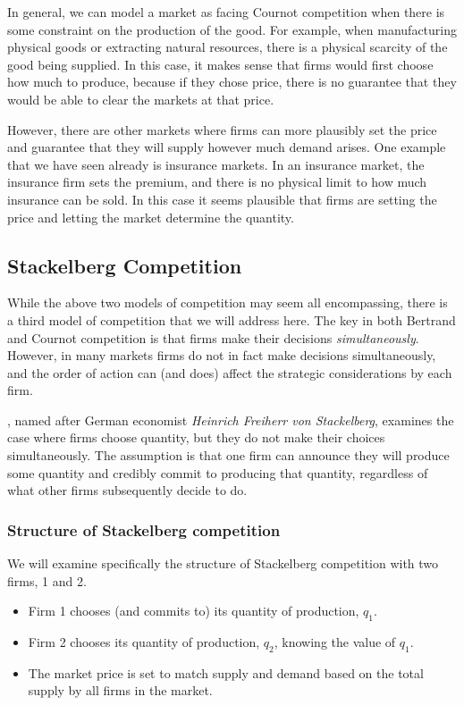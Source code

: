 In general, we can model a market as facing Cournot competition when there is some constraint on the production of the good. For example, when manufacturing physical goods or extracting natural resources, there is a physical scarcity of the good being supplied. In this case, it makes sense that firms would first choose how much to produce, because if they chose price, there is no guarantee that they would be able to clear the markets at that price.

However, there are other markets where firms can more plausibly set the price and guarantee that they will supply however much demand arises. One example that we have seen already is insurance markets. In an insurance market, the insurance firm sets the premium, and there is no physical limit to how much insurance can be sold. In this case it seems plausible that firms are setting the price and letting the market determine the quantity.

\subsection{Stackelberg Competition}
While the above two models of competition may seem all encompassing, there is a third model of competition that we will address here. The key in both Bertrand and Cournot competition is that firms make their decisions \emph{simultaneously}. However, in many markets firms do not in fact make decisions simultaneously, and the order of action can (and does) affect the strategic considerations by each firm.

, named after German economist \emph{Heinrich Freiherr von Stackelberg}, examines the case where firms choose quantity, but they do not make their choices simultaneously. The assumption is that one firm can announce they will produce some quantity and credibly commit to producing that quantity, regardless of what other firms subsequently decide to do.

\subsubsection*{Structure of Stackelberg competition}
We will examine specifically the structure of Stackelberg competition with two firms, 1 and 2. 
\begin{itemize}
    \item Firm 1 chooses (and commits to) its quantity of production, $q_1$.
    \item Firm 2 chooses its quantity of production, $q_2$, knowing the value of $q_1$. 
    \item The market price is set to match supply and demand based on the total supply by all firms in the market. 
\end{itemize}


